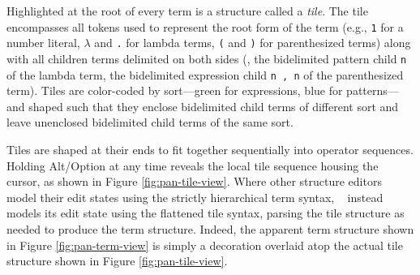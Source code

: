 



Highlighted at the root of every term is a structure called
a \emph{tile}.
The tile encompasses all tokens used to represent
the root form of the term (e.g., \texttt{1} for a number literal,
$\lambda$ and \texttt{.} for lambda terms,
\texttt{(} and \texttt{)} for parenthesized terms) along with
all children terms delimited on both sides (\eg,
the bidelimited pattern child \texttt{n} of the lambda term,
the bidelimited expression child \texttt{n , n} of
the parenthesized term).
Tiles are color-coded by sort---green for expressions, blue
for patterns---and shaped such that they enclose bidelimited
child terms of different sort and leave unenclosed bidelimited
child terms of the same sort.


Tiles are shaped at their ends to fit together sequentially
into operator sequences.
Holding Alt/Option at any time reveals the local tile sequence
housing the cursor, as shown in Figure \ref{fig:pan-tile-view}.
Where other structure editors model their edit states
using the strictly hierarchical term syntax,
\tylr~ instead models its edit state
using the flattened tile syntax, parsing the tile structure
as needed to produce the term structure.
Indeed, the apparent term structure shown in Figure
\ref{fig:pan-term-view} is simply a
decoration overlaid atop the actual tile structure shown in
Figure \ref{fig:pan-tile-view}.

